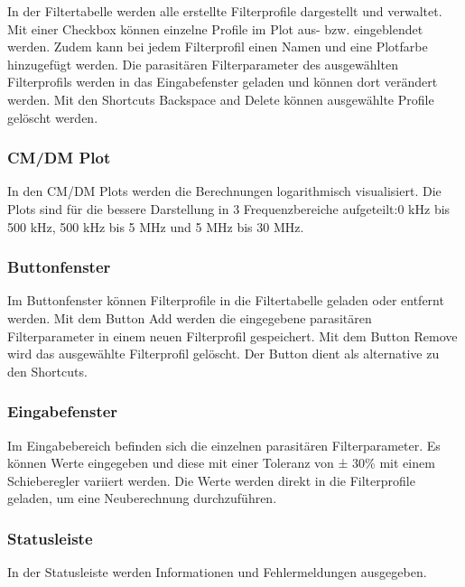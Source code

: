 In der Filtertabelle werden alle erstellte Filterprofile dargestellt und verwaltet. Mit einer Checkbox können einzelne Profile im Plot aus- bzw. eingeblendet werden. Zudem kann bei jedem Filterprofil einen Namen und eine Plotfarbe hinzugefügt werden. Die parasitären Filterparameter des ausgewählten Filterprofils werden in das Eingabefenster geladen und können dort verändert werden. Mit den Shortcuts Backspace and Delete können ausgewählte Profile gelöscht werden.

\subsubsection{CM/DM Plot} \label{subsubsec:CM_DMplot}

In den CM/DM Plots werden die Berechnungen logarithmisch visualisiert. Die Plots sind für die bessere Darstellung in 3 Frequenzbereiche aufgeteilt:0 kHz bis 500 kHz, 500 kHz bis 5 MHz und 5 MHz bis 30 MHz. 

\subsubsection{Buttonfenster} \label{subsubsec:buttonfenster}

Im Buttonfenster können Filterprofile in die Filtertabelle geladen oder entfernt werden. Mit dem Button Add werden die eingegebene parasitären Filterparameter in einem neuen Filterprofil gespeichert. Mit dem Button Remove wird das ausgewählte Filterprofil gelöscht. Der Button dient als alternative zu den Shortcuts.

\subsubsection{Eingabefenster} \label{subsubsec:eingabefenster}

Im Eingabebereich befinden sich die einzelnen parasitären Filterparameter. Es können Werte eingegeben und diese mit einer Toleranz von ± 30\% mit einem Schieberegler variiert werden. Die Werte werden direkt in die Filterprofile geladen, um eine Neuberechnung durchzuführen.

\subsubsection{Statusleiste} \label{subsubsec:statusleiste}

In der Statusleiste werden Informationen und Fehlermeldungen ausgegeben.

\newpage

